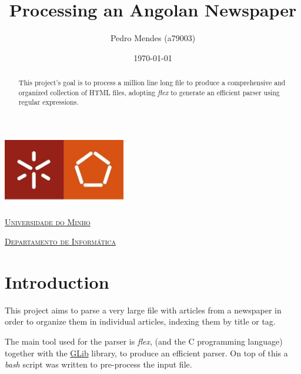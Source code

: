 \documentclass[a4paper]{report}
\begin{document}
\title{Processing an Angolan Newspaper}
\author{Pedro Mendes (a79003)}
\date{\today}

\begin{center}
    \begin{minipage}{0.75\linewidth}
        \centering
        \includegraphics[width=0.4\textwidth]{eng.jpeg}\par\vspace{1cm}
        \vspace{1.5cm}
        \href{https://www.uminho.pt/PT}
        {\scshape\LARGE Universidade do Minho} \par
        \vspace{1cm}
        \href{https://www.di.uminho.pt/}
        {\scshape\Large Departamento de Informática} \par
        \vspace{1.5cm}
        \maketitle
    \end{minipage}
\end{center}

\begin{abstract}
    \begin{center}
        This project's goal is to process a million line long file to produce a
        comprehensive and organized collection of HTML files, adopting
        \textit{flex} to generate an efficient parser using regular expressions.
    \end{center}
\end{abstract}

\tableofcontents

\pagebreak

\chapter{Introduction}
This project aims to parse a very large file with articles from a newspaper in
order to organize them in individual articles, indexing them by title or tag.

The main tool used for the parser is \textit{flex}, (and the C programming
language) together with the \href{https://developer.gnome.org/}{GLib} library,
to produce an efficient parser. On top of this a \textit{bash} script was
written to pre-process the input file.
\end{document}

